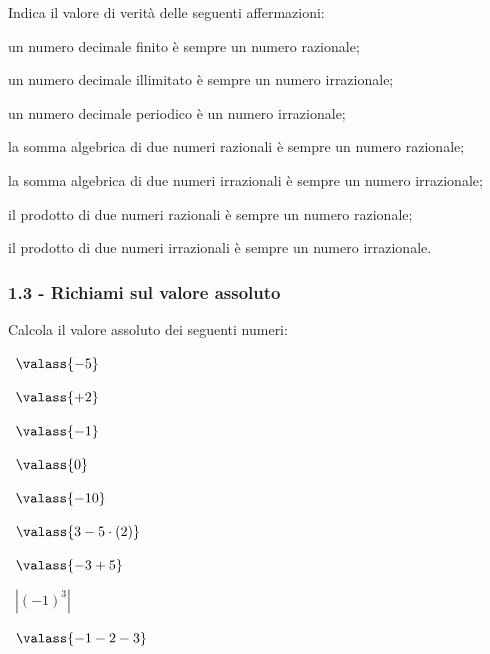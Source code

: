 \begin{esercizio}
\label{ese:1.7}
Indica il valore di verità delle seguenti affermazioni:
\begin{enumeratea}
\item un numero decimale finito è sempre un numero razionale;
\item un numero decimale illimitato è sempre un numero irrazionale;
\item un numero decimale periodico è un numero irrazionale;
\item la somma algebrica di due numeri razionali è sempre un numero razionale;
\item la somma algebrica di due numeri irrazionali è sempre un numero irrazionale;
\item il prodotto di due numeri razionali è sempre un numero razionale;
\item il prodotto di due numeri irrazionali è sempre un numero irrazionale.
\end{enumeratea}
\end{esercizio}

\subsubsection*{1.3 - Richiami sul valore assoluto}
\begin{esercizio}
\label{ese:1.8}
 Calcola il valore assoluto dei seguenti numeri:
\begin{multicols}{3}
 \begin{enumeratea}
 \item~$\valass{-5}$
 \item~$\valass{+2}$
 \item~$\valass{-1}$
 \item~$\valass{0}$
 \item~$\valass{-10}$
 \item~$\valass{3-5\cdot(2)}$
 \item~$\valass{-3+5}$
 \item~$\left|{(-1)^3}\right|$
 \item~$\valass{-1-2-3}$
 \end{enumeratea}
 \end{multicols}
\end{esercizio}

